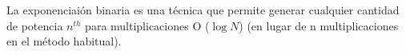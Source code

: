 La exponenciaión binaria es una técnica que permite generar cualquier cantidad de potencia $n^{th}$ para multiplicaciones O ($\log N$) (en lugar de n multiplicaciones en el método habitual).